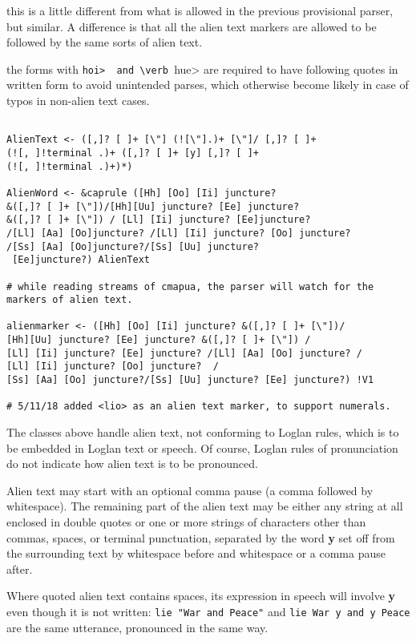 \documentclass{article}
\begin{document}
 this is a little different from what is allowed in the previous provisional parser, but similar.
 A difference is that all the alien text markers are allowed to be followed by the same sorts of alien text.

 the forms with \verb <hoi>  and \verb <hue>  are required to have following quotes in written form to avoid
 unintended parses, which otherwise become likely in case of typos in non-alien text cases.

\begin{verbatim}

AlienText <- ([,]? [ ]+ [\"] (![\"].)+ [\"]/ [,]? [ ]+ 
(![, ]!terminal .)+ ([,]? [ ]+ [y] [,]? [ ]+ 
(![, ]!terminal .)+)*)

AlienWord <- &caprule ([Hh] [Oo] [Ii] juncture? 
&([,]? [ ]+ [\"])/[Hh][Uu] juncture? [Ee] juncture? 
&([,]? [ ]+ [\"]) / [Ll] [Ii] juncture? [Ee]juncture? 
/[Ll] [Aa] [Oo]juncture? /[Ll] [Ii] juncture? [Oo] juncture? 
/[Ss] [Aa] [Oo]juncture?/[Ss] [Uu] juncture?
 [Ee]juncture?) AlienText

# while reading streams of cmapua, the parser will watch for the markers of alien text.

alienmarker <- ([Hh] [Oo] [Ii] juncture? &([,]? [ ]+ [\"])/
[Hh][Uu] juncture? [Ee] juncture? &([,]? [ ]+ [\"]) / 
[Ll] [Ii] juncture? [Ee] juncture? /[Ll] [Aa] [Oo] juncture? /
[Ll] [Ii] juncture? [Oo] juncture?  /
[Ss] [Aa] [Oo] juncture?/[Ss] [Uu] juncture? [Ee] juncture?) !V1

# 5/11/18 added <lio> as an alien text marker, to support numerals.

\end{verbatim}

The classes above handle alien text,  not conforming to Loglan rules, which is to be embedded in Loglan text or speech.  Of course, Loglan rules of pronunciation do not indicate how alien text is to be pronounced.

Alien text may start with an optional comma pause (a comma followed by whitespace).  The remaining part of the alien text may be either
any string at all enclosed in double quotes  or one or more strings of characters other than commas, spaces, or terminal punctuation, separated by the word {\bf y} set off from the surrounding text
by whitespace before and whitespace or a comma pause after.

Where quoted alien text contains spaces, its expression in speech will involve {\bf y} even though it is not written:  {\tt lie "War and Peace"} and {\tt lie War y and y Peace} are the same utterance, pronounced in the same way.
\end{document}
